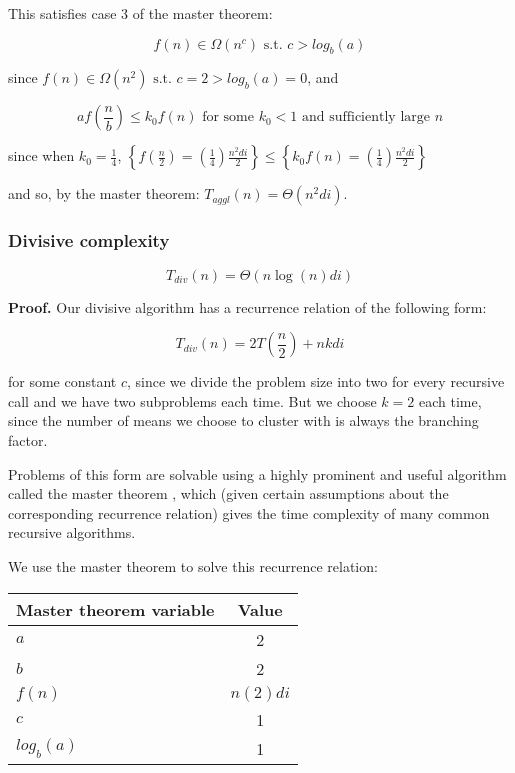 \documentclass[../tech_report_1.tex]{subfiles}
\begin{document}
This satisfies case 3 of the master theorem:

$$ f(n) \in \Omega(n^c) \text{ s.t. } c > log_b(a) $$

since $f(n) \in \Omega(n^2) \text{ s.t. } c = 2 > log_b(a) = 0$, and

$$ af(\frac{n}{b}) \leq k_0 f(n) \text{ for some } k_0 < 1 \text{ and sufficiently large } n$$

since when  $k_0 = \frac{1}{4}$, $\left\{f(\frac{n}{2}) = (\frac{1}{4}) \frac{n^2di}{2}\right\} \leq \left\{k_0f(n) = (\frac{1}{4}) \frac{n^2di}{2}\right\}$

and so, by the master theorem: $ T_{aggl}(n) = \Theta(n^2di)$. \qedsymbol


\subsubsection{Divisive complexity}

\begin{theorem} $$ T_{div}(n) = \Theta(n\log(n)di) $$ \end{theorem}

\textbf{Proof.} Our divisive algorithm has a recurrence relation of the following form:

$$ T_{div}(n) = 2T(\frac{n}{2}) + nkdi $$

for some constant $c$, since we divide the problem size into two for every recursive call and we have two subproblems each time. But we choose $k=2$ each time, since the number of means we choose to cluster with is always the branching factor.

Problems of this form are solvable using a highly prominent and useful algorithm called the master theorem \cite{thomas2001introduction}, which (given certain assumptions about the corresponding recurrence relation) gives the time complexity of many common recursive algorithms.

We use the master theorem to solve this recurrence relation:

\begin{table}[ht]
\centering
\begin{tabular}{l || c }
\hline
\textbf{Master theorem variable} & \textbf{Value} \\
\hline
$a$ & 2 \\
$b$ & 2 \\
$f(n)$ & ${n(2)di}$ \\
$c$ & 1 \\
$log_b(a)$ & 1 \\
\hline
\end{tabular}
\end{table}
\end{document}
